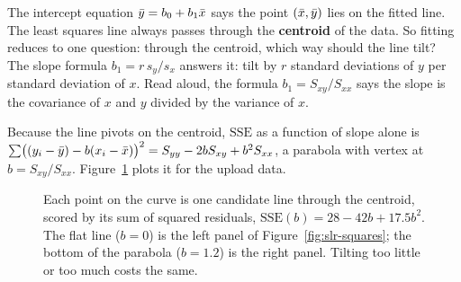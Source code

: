 \begin{intuitionbox}
The intercept equation $\bar{y} = b_0 + b_1\bar{x}$ says the point $(\bar{x},\bar{y})$
lies on the fitted line. The least squares line always passes through the
\textbf{centroid} of the data. So fitting reduces to one question: through the
centroid, which way should the line tilt? The slope formula
$b_1 = r\,s_y/s_x$ answers it: tilt by $r$ standard deviations of $y$ per
standard deviation of $x$. Read aloud, the formula $b_1 = S_{xy}/S_{xx}$ says the slope is the covariance of $x$ and $y$ divided by the variance of $x$.
\end{intuitionbox}

Because the line pivots on the centroid, $\mathrm{SSE}$ as a function of slope
alone is
$\sum\bigl((y_i-\bar{y})-b(x_i-\bar{x})\bigr)^2 = S_{yy} - 2bS_{xy} + b^2S_{xx}$,
a parabola with vertex at $b = S_{xy}/S_{xx}$. Figure~\ref{fig:slr-sse-bowl}
plots it for the upload data.

\begin{figure}[H]
\centering
{}
\caption{Each point on the curve is one candidate line through the centroid,
scored by its sum of squared residuals,
$\mathrm{SSE}(b) = 28 - 42b + 17.5b^2$. The flat line ($b=0$) is the left
panel of Figure~\ref{fig:slr-squares}; the bottom of the parabola ($b=1.2$) is
the right panel. Tilting too little or too much costs the same.}
\label{fig:slr-sse-bowl}
\end{figure}

